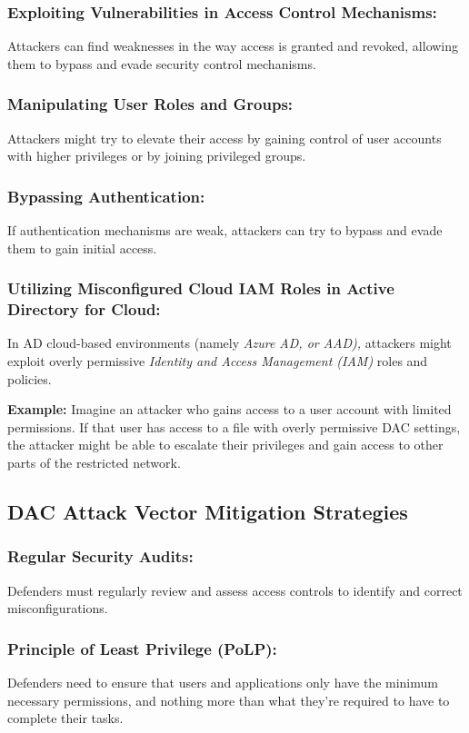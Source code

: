 \subsubsection{Exploiting Vulnerabilities in Access Control Mechanisms:}
Attackers can find weaknesses in the way access is granted and revoked, allowing them to bypass and evade security control mechanisms.

\subsubsection{Manipulating User Roles and Groups:}
Attackers might try to elevate their access by gaining control of user accounts with higher privileges or by joining privileged groups.

\subsubsection{Bypassing Authentication:}
If authentication mechanisms are weak, attackers can try to bypass and evade them to gain initial access.

\subsubsection{Utilizing Misconfigured Cloud IAM Roles in Active Directory for Cloud:}
In AD cloud-based environments (namely \textit{Azure AD, or AAD),} attackers might exploit overly permissive \textit{Identity and Access Management (IAM)} roles and policies.

\textbf{Example:}
Imagine an attacker who gains access to a user account with limited permissions. If that user has access to a file with overly permissive DAC settings, the attacker might be able to escalate their privileges and gain access to other parts of the restricted network.

\subsection{DAC Attack Vector Mitigation Strategies}
\subsubsection{\textbf{Regular Security Audits:}}
Defenders must regularly review and assess access controls to identify and correct misconfigurations.

\subsubsection{\textbf{Principle of Least Privilege (PoLP):}}
Defenders need to ensure that users and applications only have the minimum necessary permissions, and nothing more than what they're required to have to complete their tasks.

